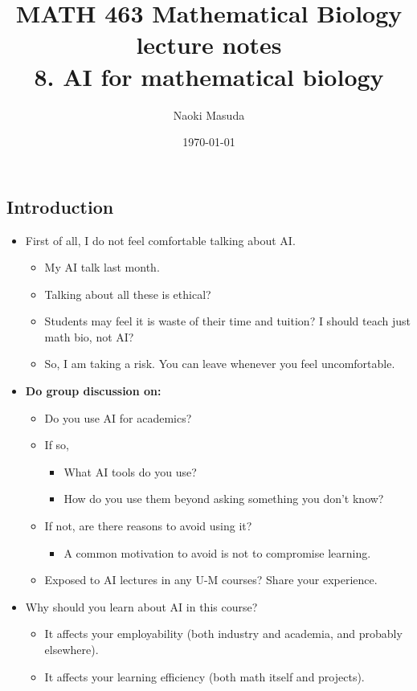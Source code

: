 \documentclass[20pt]{extarticle}
\begin{document}
\title{MATH 463 Mathematical Biology\\ lecture notes\\
8. AI for mathematical biology}
\date{\today}
\author{Naoki Masuda}

\maketitle

\subsection*{Introduction}

\begin{itemize}
%
\item First of all, I do not feel comfortable talking about AI.
	\begin{itemize}
	\item My AI talk last month.
	\item Talking about all these is ethical?
	\item Students may feel it is waste of their time and tuition? I should teach just math bio, not AI?
	\item So, I am taking a risk. You can leave whenever you feel uncomfortable.
	\end{itemize}
\item \textbf{Do group discussion on:}
	\begin{itemize}
	\item Do you use AI for academics?
	\item If so,
		\begin{itemize}
		\item What AI tools do you use?
		\item How do you use them beyond asking something you don't know?
		\end{itemize}
	\item If not, are there reasons to avoid using it?
		\begin{itemize}
		\item A common motivation to avoid is not to compromise learning.
		\end{itemize}
	\item Exposed to AI lectures in any U-M courses? Share your experience.
	\end{itemize}
\item Why should you learn about AI in this course?
	\begin{itemize}	
	\item It affects your employability (both industry and academia, and probably elsewhere).
	\item It affects your learning efficiency (both math itself and projects).
	\end{itemize}
\end{itemize}
\end{document}
